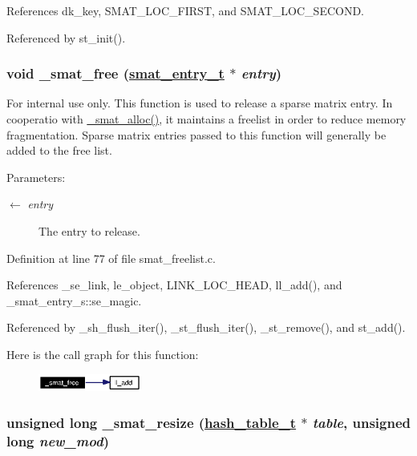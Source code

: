References dk\_\-key, SMAT\_\-LOC\_\-FIRST, and SMAT\_\-LOC\_\-SECOND.

Referenced by st\_\-init().\hypertarget{group__dbprim__smat_ga26}{
\subsubsection[\_\-smat\_\-free]{\setlength{\rightskip}{0pt plus 5cm}void \_\-smat\_\-free (\hyperlink{struct__smat__entry__s}{smat\_\-entry\_\-t} $\ast$ {\em entry})}}
\label{group__dbprim__smat_ga26}


\begin{Desc}
\item[For internal use only.]
This function is used to release a sparse matrix entry. In cooperatio with \hyperlink{group__dbprim__smat_ga25}{\_\-smat\_\-alloc()}, it maintains a freelist in order to reduce memory fragmentation. Sparse matrix entries passed to this function will generally be added to the free list.

\begin{Desc}
\item[Parameters:]
\begin{description}
\item[\mbox{$\leftarrow$} {\em entry}]The entry to release.\end{description}
\end{Desc}
\end{Desc}


Definition at line 77 of file smat\_\-freelist.c.

References \_\-se\_\-link, le\_\-object, LINK\_\-LOC\_\-HEAD, ll\_\-add(), and \_\-smat\_\-entry\_\-s::se\_\-magic.

Referenced by \_\-sh\_\-flush\_\-iter(), \_\-st\_\-flush\_\-iter(), \_\-st\_\-remove(), and st\_\-add().

Here is the call graph for this function:\begin{figure}[H]
\begin{center}
\leavevmode
\includegraphics[width=96pt]{group__dbprim__smat_ga26_cgraph}
\end{center}
\end{figure}
\hypertarget{group__dbprim__smat_ga11}{
\subsubsection[\_\-smat\_\-resize]{\setlength{\rightskip}{0pt plus 5cm}unsigned long \_\-smat\_\-resize (\hyperlink{struct__hash__table__s}{hash\_\-table\_\-t} $\ast$ {\em table}, unsigned long {\em new\_\-mod})}}
\label{group__dbprim__smat_ga11}


